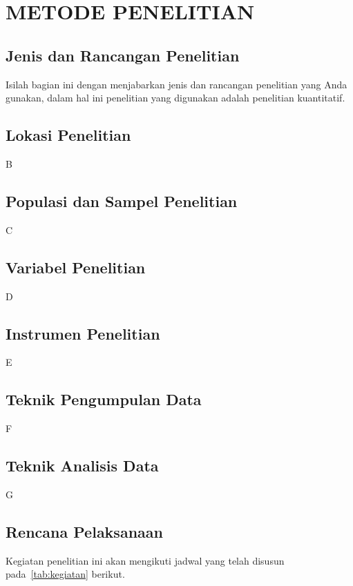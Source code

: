 \chapter{METODE PENELITIAN}

\section{Jenis dan Rancangan Penelitian}
Isilah bagian ini dengan menjabarkan jenis dan rancangan penelitian yang Anda gunakan, dalam hal ini penelitian yang digunakan adalah penelitian kuantitatif.
\section{Lokasi Penelitian}
B
\section{Populasi dan Sampel Penelitian}
C
\section{Variabel Penelitian}
D
\section{Instrumen Penelitian}
E
\section{Teknik Pengumpulan Data}
F
\section{Teknik Analisis Data}
G
\section{Rencana Pelaksanaan}
Kegiatan penelitian ini akan mengikuti jadwal yang telah disusun pada~\ref{tab:kegiatan} berikut.

